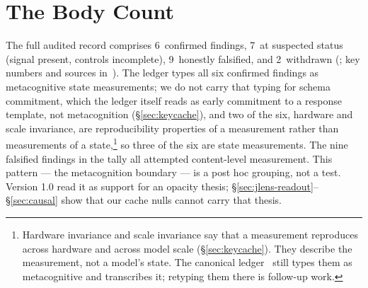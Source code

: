 \documentclass[11pt,a4paper]{article}
\begin{document}
\section{The Body Count}
\label{sec:bodycount}

The full audited record comprises 6~confirmed findings, 7~at
suspected status (signal present, controls incomplete), 9~honestly
falsified, and 2~withdrawn (; key numbers and
sources in~\citet{lyra2026metapattern}). The ledger types all six
confirmed findings as metacognitive state measurements; we do not carry
that typing for schema commitment, which the ledger itself reads as
early commitment to a response template, not metacognition
(\S\ref{sec:keycache}), and two of the six, hardware and scale
invariance, are reproducibility properties of a measurement rather than
measurements of a state,\footnote{Hardware invariance and scale
invariance say that a measurement reproduces across hardware and across
model scale (\S\ref{sec:keycache}). They describe the measurement, not
a model's state. The canonical ledger~\citep{lyra2026metapattern} still
types them as metacognitive and  transcribes it;
retyping them there is follow-up work.} so three of the six are state
measurements. The nine falsified findings in the tally all
attempted content-level measurement. This pattern --- the metacognition
boundary --- is a post hoc grouping, not a test. Version 1.0 read it as
support for an opacity thesis; \S\ref{sec:jlens-readout}--\S\ref{sec:causal}
show that our cache nulls cannot carry that thesis.
\end{document}
